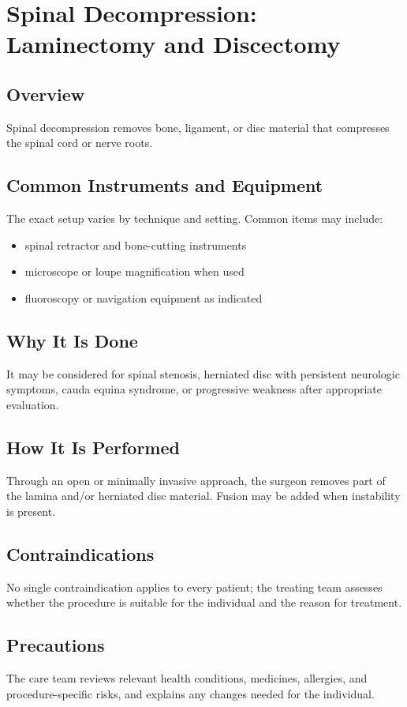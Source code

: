 \chapter{Spinal Decompression: Laminectomy and Discectomy}
\section*{Overview}
Spinal decompression removes bone, ligament, or disc material that compresses the spinal cord or nerve roots.
\section*{Common Instruments and Equipment}
The exact setup varies by technique and setting. Common items may include:
\begin{itemize}[nosep,leftmargin=*]
  \item spinal retractor and bone-cutting instruments
  \item microscope or loupe magnification when used
  \item fluoroscopy or navigation equipment as indicated
\end{itemize}

\section*{Why It Is Done}
It may be considered for spinal stenosis, herniated disc with persistent neurologic symptoms, cauda equina syndrome, or progressive weakness after appropriate evaluation.
\section*{How It Is Performed}
Through an open or minimally invasive approach, the surgeon removes part of the lamina and/or herniated disc material. Fusion may be added when instability is present.
\section*{Contraindications}
No single contraindication applies to every patient; the treating team assesses whether the procedure is suitable for the individual and the reason for treatment.

\section*{Precautions}
The care team reviews relevant health conditions, medicines, allergies, and procedure-specific risks, and explains any changes needed for the individual.

